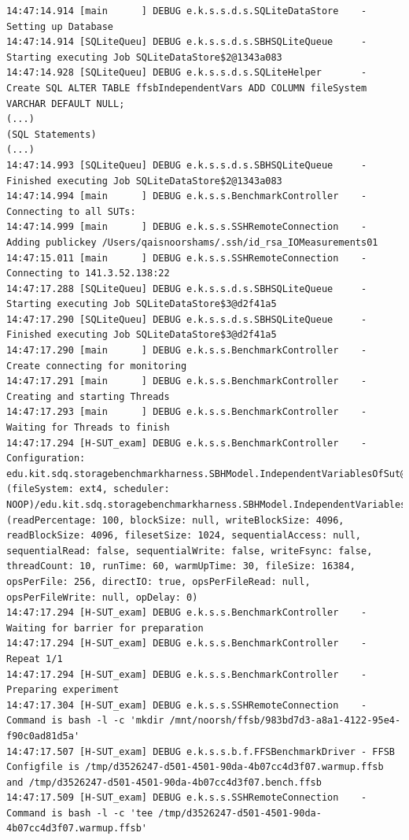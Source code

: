 \begin{lstlisting}
14:47:14.914 [main      ] DEBUG e.k.s.s.d.s.SQLiteDataStore    - Setting up Database
14:47:14.914 [SQLiteQueu] DEBUG e.k.s.s.d.s.SBHSQLiteQueue     - Starting executing Job SQLiteDataStore$2@1343a083
14:47:14.928 [SQLiteQueu] DEBUG e.k.s.s.d.s.SQLiteHelper       - Create SQL ALTER TABLE ffsbIndependentVars ADD COLUMN fileSystem VARCHAR DEFAULT NULL;
(...)
(SQL Statements)
(...)
14:47:14.993 [SQLiteQueu] DEBUG e.k.s.s.d.s.SBHSQLiteQueue     - Finished executing Job SQLiteDataStore$2@1343a083
14:47:14.994 [main      ] DEBUG e.k.s.s.BenchmarkController    - Connecting to all SUTs:
14:47:14.999 [main      ] DEBUG e.k.s.s.SSHRemoteConnection    - Adding publickey /Users/qaisnoorshams/.ssh/id_rsa_IOMeasurements01
14:47:15.011 [main      ] DEBUG e.k.s.s.SSHRemoteConnection    - Connecting to 141.3.52.138:22
14:47:17.288 [SQLiteQueu] DEBUG e.k.s.s.d.s.SBHSQLiteQueue     - Starting executing Job SQLiteDataStore$3@d2f41a5
14:47:17.290 [SQLiteQueu] DEBUG e.k.s.s.d.s.SBHSQLiteQueue     - Finished executing Job SQLiteDataStore$3@d2f41a5
14:47:17.290 [main      ] DEBUG e.k.s.s.BenchmarkController    - Create connecting for monitoring
14:47:17.291 [main      ] DEBUG e.k.s.s.BenchmarkController    - Creating and starting Threads
14:47:17.293 [main      ] DEBUG e.k.s.s.BenchmarkController    - Waiting for Threads to finish
14:47:17.294 [H-SUT_exam] DEBUG e.k.s.s.BenchmarkController    - Configuration: edu.kit.sdq.storagebenchmarkharness.SBHModel.IndependentVariablesOfSut@21455cf0 (fileSystem: ext4, scheduler: NOOP)/edu.kit.sdq.storagebenchmarkharness.SBHModel.IndependentVariablesOfFFSB@50d8a1a0 (readPercentage: 100, blockSize: null, writeBlockSize: 4096, readBlockSize: 4096, filesetSize: 1024, sequentialAccess: null, sequentialRead: false, sequentialWrite: false, writeFsync: false, threadCount: 10, runTime: 60, warmUpTime: 30, fileSize: 16384, opsPerFile: 256, directIO: true, opsPerFileRead: null, opsPerFileWrite: null, opDelay: 0)
14:47:17.294 [H-SUT_exam] DEBUG e.k.s.s.BenchmarkController    - Waiting for barrier for preparation
14:47:17.294 [H-SUT_exam] DEBUG e.k.s.s.BenchmarkController    - Repeat 1/1
14:47:17.294 [H-SUT_exam] DEBUG e.k.s.s.BenchmarkController    - Preparing experiment
14:47:17.304 [H-SUT_exam] DEBUG e.k.s.s.SSHRemoteConnection    - Command is bash -l -c 'mkdir /mnt/noorsh/ffsb/983bd7d3-a8a1-4122-95e4-f90c0ad81d5a'
14:47:17.507 [H-SUT_exam] DEBUG e.k.s.s.b.f.FFSBenchmarkDriver - FFSB Configfile is /tmp/d3526247-d501-4501-90da-4b07cc4d3f07.warmup.ffsb and /tmp/d3526247-d501-4501-90da-4b07cc4d3f07.bench.ffsb
14:47:17.509 [H-SUT_exam] DEBUG e.k.s.s.SSHRemoteConnection    - Command is bash -l -c 'tee /tmp/d3526247-d501-4501-90da-4b07cc4d3f07.warmup.ffsb'

\end{lstlisting}
